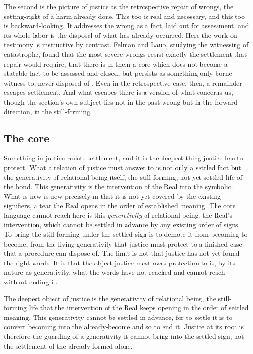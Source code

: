 The second is the picture of justice as the retrospective repair of wrongs, the setting-right of a harm already done. This too is real and necessary, and this too is backward-looking. It addresses the wrong as a fact, laid out for assessment, and its whole labor is the disposal of what has already occurred. Here the work on testimony is instructive by contrast. Felman and Laub, studying the witnessing of catastrophe, found that the most severe wrongs resist exactly the settlement that repair would require, that there is in them a core which does not become a statable fact to be assessed and closed, but persists as something only borne witness to, never disposed of \parencite{felman1992testimony}. Even in the retrospective case, then, a remainder escapes settlement. And what escapes there is a version of what concerns us, though the section's own subject lies not in the past wrong but in the forward direction, in the still-forming.

\subsection*{The core}

Something in justice resists settlement, and it is the deepest thing justice has to protect. What a relation of justice must answer to is not only a settled fact but the generativity of relational being itself, the still-forming, not-yet-settled life of the bond. This generativity is the intervention of the Real into the symbolic. What is new is new precisely in that it is not yet covered by the existing signifiers, a tear the Real opens in the order of established meaning. The core language cannot reach here is this \emph{generativity} of relational being, the Real's intervention, which cannot be settled in advance by any existing order of signs. To bring the still-forming under the settled sign is to demote it from becoming to become, from the living generativity that justice must protect to a finished case that a procedure can dispose of. The limit is not that justice has not yet found the right words. It is that the object justice most owes protection to is, by its nature as generativity, what the words have not reached and cannot reach without ending it.

\begin{claim}
The deepest object of justice is the generativity of relational being, the still-forming life that the intervention of the Real keeps opening in the order of settled meaning. This generativity cannot be settled in advance, for to settle it is to convert becoming into the already-become and so to end it. Justice at its root is therefore the guarding of a generativity it cannot bring into the settled sign, not the settlement of the already-formed alone.
\end{claim}

